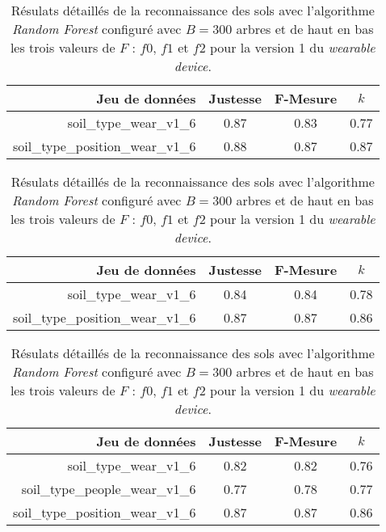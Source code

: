 \begin{table}[H]\renewcommand{\arraystretch}{0.5}
	\centering
	\caption{Résulats détaillés de la reconnaissance des sols avec l'algorithme \textit{Random Forest} configuré avec $B=300$ arbres et de haut en bas les trois valeurs de $F$ : $f0$, $f1$ et $f2$ pour la version 1 du \textit{wearable device}.}
	\label{tab:rf-300-wear-v1}
	\begin{tabular}{@{}rccc@{}}
		\toprule
			\textbf{Jeu de données} & \textbf{Justesse} & \textbf{F-Mesure} & \textbf{$k$} \\
		\midrule
			soil\_type\_wear\_v1\_6 & 0.87 & 0.83 & 0.77 \\
			soil\_type\_position\_wear\_v1\_6 & 0.88 & 0.87 & 0.87 \\
	\end{tabular}
	\begin{tabular}{@{}rccc@{}}
		\toprule
			\textbf{Jeu de données} & \textbf{Justesse} & \textbf{F-Mesure} & \textbf{$k$} \\
		\midrule
			soil\_type\_wear\_v1\_6 & 0.84 & 0.84 & 0.78 \\
			soil\_type\_position\_wear\_v1\_6 & 0.87 & 0.87 & 0.86 \\
	\end{tabular}
	\begin{tabular}{@{}rccc@{}}
		\toprule
			\textbf{Jeu de données} & \textbf{Justesse} & \textbf{F-Mesure} & \textbf{$k$} \\
		\midrule
			soil\_type\_wear\_v1\_6 & 0.82 & 0.82 & 0.76 \\
			soil\_type\_people\_wear\_v1\_6 & 0.77 & 0.78 & 0.77 \\
			soil\_type\_position\_wear\_v1\_6 & 0.87 & 0.87 & 0.86 \\
		\bottomrule
	\end{tabular}
\end{table}

